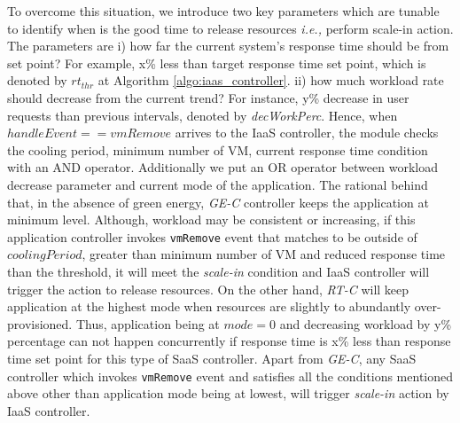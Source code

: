 To overcome this situation, we introduce two key parameters which are tunable to identify when is the good time to release resources \emph{i.e.,} perform scale-in action. The parameters are i) how far the current system's response time should be from set point? For example, x\% less than target response time set point, which is denoted by $rt_{thr}$ at Algorithm \ref{algo:iaas_controller}. ii) how much workload rate should decrease from the current trend? For instance, y\% decrease in user requests than previous intervals, denoted by \emph{decWorkPerc}. Hence, when $handleEvent == vmRemove$ arrives to the IaaS controller, the module checks the cooling period, minimum number of VM, current response time condition
with an AND operator. Additionally we put an OR operator between workload decrease parameter and current mode of the application. The rational behind that, in the absence of green energy, \emph{GE-C} controller keeps the application at minimum level. Although, workload may be consistent or increasing, if this application controller invokes \texttt{vmRemove} event that matches to be outside of $coolingPeriod$, greater than minimum number of VM and reduced response time than the threshold, it will meet the \emph{scale-in} condition and IaaS controller will trigger the action to release resources. On the other hand, \emph{RT-C} will keep application at the highest mode when resources are slightly to abundantly over-provisioned. Thus, application being at $mode=0$ and decreasing workload by y\% percentage can not happen concurrently if response time is x\% less than response time set point for this type of SaaS controller. Apart from \emph{GE-C}, any SaaS controller which invokes \texttt{vmRemove} event and satisfies all the conditions mentioned above other than application mode being at lowest, will trigger \emph{scale-in} action by IaaS controller.




